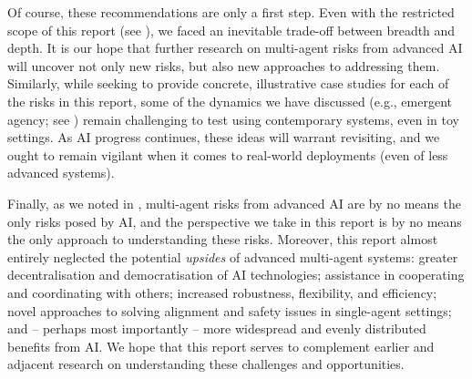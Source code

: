 Of course, these recommendations are only a first step.
Even with the restricted scope of this report (see ), we faced an inevitable trade-off between breadth and depth.
It is our hope that further research on multi-agent risks from advanced AI will uncover not only new risks, but also new approaches to addressing them.
Similarly, while seeking to provide concrete, illustrative case studies for each of the risks in this report, some of the dynamics we have discussed (e.g., emergent agency; see ) remain challenging to test using contemporary systems, even in toy settings.
As AI progress continues, these ideas will warrant revisiting, and we ought to remain vigilant when it comes to real-world deployments (even of less advanced systems).

Finally, as we noted in , multi-agent risks from advanced AI are by no means the only risks posed by AI, and the perspective we take in this report is by no means the only approach to understanding these risks.
Moreover, this report almost entirely neglected the potential \textit{upsides} of advanced multi-agent systems:
greater decentralisation and democratisation of AI technologies;
assistance in cooperating and coordinating with others;
increased robustness, flexibility, and efficiency; 
novel approaches to solving alignment and safety issues in single-agent settings; 
and -- perhaps most importantly -- more widespread and evenly distributed benefits from AI. 
We hope that this report serves to complement earlier and adjacent research on understanding these challenges and opportunities.
